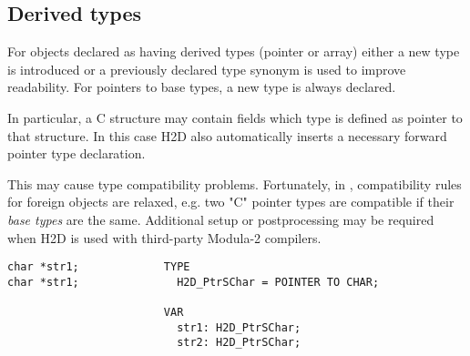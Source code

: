 \subsection{Derived types}
\label{rules:types:derived}

For objects declared as having derived types (pointer or array)
either a new \mt{} type is introduced or a previously declared type synonym
is used to improve readability. For pointers to base types,
a new type is always declared.

In particular, a C structure may contain fields which type
is defined as pointer to that structure. In this case H2D
also automatically inserts a necessary forward pointer type
declaration.

This may cause type compatibility problems.
Fortunately, in , compatibility
rules for foreign objects are relaxed, e.g. two "C" pointer types
are compatible if their {\em base types} are the same.
Additional setup or postprocessing may be required when H2D
is used with third-party Modula-2 compilers.

{\ifonline\else\small\fi
{\samepage
\begin{verbatim}
char *str1;             TYPE
char *str1;               H2D_PtrSChar = POINTER TO CHAR;

                        VAR
                          str1: H2D_PtrSChar;
                          str2: H2D_PtrSChar;
\end{verbatim}
} %
{} %
{} %
{} %
} %
\pagebreak[1]

